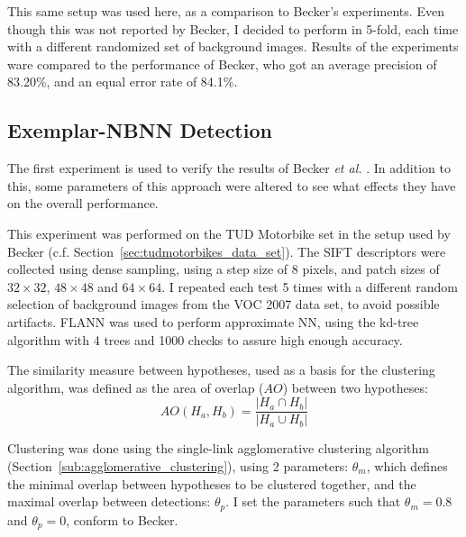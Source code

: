 This same setup was used here, as a comparison to Becker's experiments. Even though this was not reported by Becker, I decided to perform in 5-fold, each time with a different randomized set of background images. Results of the experiments ware compared to the performance of Becker, who got an average precision of 83.20\%, and an equal error rate of 84.1\%.



% 

\subsection{Exemplar-NBNN Detection} %
\label{sec:nbnn_detection}

The first experiment is used to verify the results of Becker \emph{et al.} \cite{becker2012codebook}. In addition to this, some parameters of this approach were altered to see what effects they have on the overall performance.

This experiment was performed on the TUD Motorbike set in the setup used by Becker (c.f. Section~\ref{sec:tudmotorbikes_data_set}). The SIFT descriptors were collected using dense sampling, using a step size of 8 pixels, and patch sizes of $32\times32$, $48\times48$ and $64\times64$. I repeated each test 5 times with a different random selection of background images from the VOC 2007 data set, to avoid possible artifacts. FLANN was used to perform approximate NN, using the kd-tree algorithm with 4 trees and 1000 checks to assure high enough accuracy.

The similarity measure between hypotheses, used as a basis for the clustering algorithm, was defined as the area of overlap ($AO$) between two hypotheses:
\begin{equation}
    AO(H_a, H_b)= \frac{|H_a\cap H_b|}{|H_a\cup H_b|}
\end{equation}

Clustering was done using the single-link agglomerative clustering algorithm (Section~\ref{sub:agglomerative_clustering}), using 2 parameters: $\theta_m$, which defines the minimal overlap between hypotheses to be clustered together, and the maximal overlap between detections: $\theta_p$. I set the parameters such that $\theta_m = 0.8$ and $\theta_p = 0$, conform to Becker.

